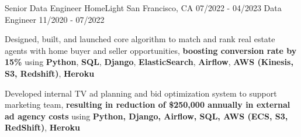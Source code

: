 \begin{cventries}
\cventryupdate
    {Senior Data Engineer} %
    {HomeLight} %
    {San Francisco, CA} %
    {07/2022 - 04/2023} %
    {Data Engineer} %
    {11/2020 - 07/2022} %
    {
      \begin{cvitems} %
        \item{Designed, built, and launched core algorithm to match and rank real estate agents with home buyer and seller opportunities, \textbf{boosting conversion rate by 15\%} using \textbf{Python}, \textbf{SQL}, \textbf{Django}, \textbf{ElasticSearch}, \textbf{Airflow}, \textbf{AWS (Kinesis, S3, Redshift)}, \textbf{Heroku}}
        \item{Developed internal TV ad planning and bid optimization system to support marketing team, \textbf{resulting in reduction of \$250,000 annually in external ad agency costs} using \textbf{Python, Django, Airflow, SQL, AWS (ECS, S3, RedShift)}, \textbf{Heroku}}

\end{cvitems}}
\end{cventries}
